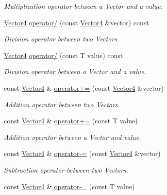 \begin{DoxyCompactItemize}
\begin{DoxyCompactList}\small\item\em Multiplication operator between a Vector and a value. \end{DoxyCompactList}\item 
\hyperlink{classsparky_1_1_vector4}{Vector4} \hyperlink{classsparky_1_1_vector4_a266e30d3d6e03535d3d91724ae9cc17a}{operator/} (const \hyperlink{classsparky_1_1_vector4}{Vector4} \&vector) const 
\begin{DoxyCompactList}\small\item\em Division operator between two Vectors. \end{DoxyCompactList}\item 
\hyperlink{classsparky_1_1_vector4}{Vector4} \hyperlink{classsparky_1_1_vector4_a5a411d7279748691c9f0c631a888f4d3}{operator/} (const T value) const 
\begin{DoxyCompactList}\small\item\em Division operator between a Vector and a value. \end{DoxyCompactList}\item 
const \hyperlink{classsparky_1_1_vector4}{Vector4} \& \hyperlink{classsparky_1_1_vector4_a91c78d0ebd16d0c40d86829b528944ec}{operator+=} (const \hyperlink{classsparky_1_1_vector4}{Vector4} \&vector)
\begin{DoxyCompactList}\small\item\em Addition operator between two Vectors. \end{DoxyCompactList}\item 
const \hyperlink{classsparky_1_1_vector4}{Vector4} \& \hyperlink{classsparky_1_1_vector4_acf85ca22c664356c427aec967d655b61}{operator+=} (const T value)
\begin{DoxyCompactList}\small\item\em Addition operator between a Vector and value. \end{DoxyCompactList}\item 
const \hyperlink{classsparky_1_1_vector4}{Vector4} \& \hyperlink{classsparky_1_1_vector4_a5a4414688113d3eb9d7efbe6bb864d99}{operator-\/=} (const \hyperlink{classsparky_1_1_vector4}{Vector4} \&vector)
\begin{DoxyCompactList}\small\item\em Subtraction operator between two Vectors. \end{DoxyCompactList}\item 
const \hyperlink{classsparky_1_1_vector4}{Vector4} \& \hyperlink{classsparky_1_1_vector4_abbe32914de20f7d6519a86c7e214626f}{operator-\/=} (const T value)

\end{DoxyCompactItemize}
